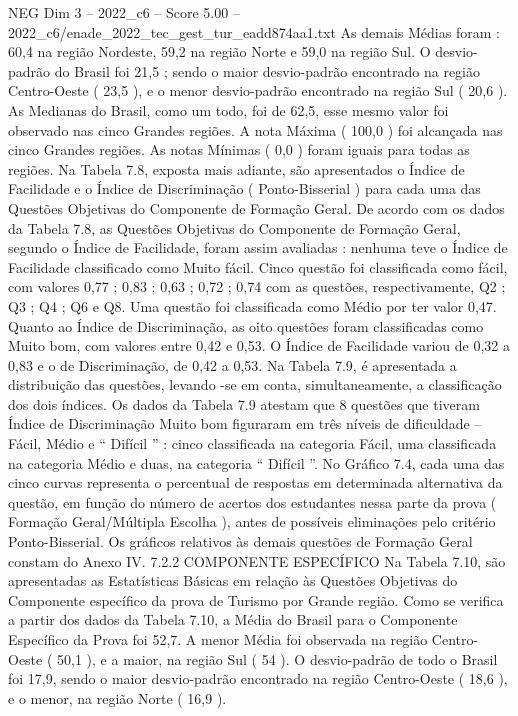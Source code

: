 \begin{textsample}{NEG Dim 3 – 2022\_c6 – Score 5.00 – 2022\_c6/enade\_2022\_tec\_gest\_tur\_eadd874aa1.txt}
As demais Médias foram : 60,4 na região Nordeste, 59,2 na região Norte e 59,0 na região Sul.
O desvio-padrão do Brasil foi 21,5 ; sendo o maior desvio-padrão encontrado na região Centro-Oeste ( 23,5 ), e o menor desvio-padrão encontrado na região Sul ( 20,6 ).
As Medianas do Brasil, como um todo, foi de 62,5, esse mesmo valor foi observado nas cinco Grandes regiões.
A nota Máxima ( 100,0 ) foi alcançada nas cinco Grandes regiões.
As notas Mínimas ( 0,0 ) foram iguais para todas as regiões.
Na Tabela 7.8, exposta mais adiante, são apresentados o Índice de Facilidade e o Índice de Discriminação ( Ponto-Bisserial ) para cada uma das Questões Objetivas do Componente de Formação Geral.
De acordo com os dados da Tabela 7.8, as Questões Objetivas do Componente de Formação Geral, segundo o Índice de Facilidade, foram assim avaliadas : nenhuma teve o Índice de Facilidade classificado como Muito fácil.
Cinco questão foi classificada como fácil, com valores 0,77 ; 0,83 ; 0,63 ; 0,72 ; 0,74 com as questões, respectivamente, Q2 ; Q3 ; Q4 ; Q6 e Q8.
Uma questão foi classificada como Médio por ter valor 0,47.
Quanto ao Índice de Discriminação, as oito questões foram classificadas como Muito bom, com valores entre 0,42 e 0,53.
O Índice de Facilidade variou de 0,32 a 0,83 e o de Discriminação, de 0,42 a 0,53.
Na Tabela 7.9, é apresentada a distribuição das questões, levando -se em conta, simultaneamente, a classificação dos dois índices.
Os dados da Tabela 7.9 atestam que 8 questões que tiveram Índice de Discriminação Muito bom figuraram em três níveis de dificuldade – Fácil, Médio e “ Difícil ” : cinco classificada na categoria Fácil, uma classificada na categoria Médio e duas, na categoria “ Difícil ”.
No Gráfico 7.4, cada uma das cinco curvas representa o percentual de respostas em determinada alternativa da questão, em função do número de acertos dos estudantes nessa parte da prova ( Formação Geral/Múltipla Escolha ), antes de possíveis eliminações pelo critério Ponto-Bisserial.
Os gráficos relativos às demais questões de Formação Geral constam do Anexo IV. 7.2.2 COMPONENTE ESPECÍFICO Na Tabela 7.10, são apresentadas as Estatísticas Básicas em relação às Questões Objetivas do Componente específico da prova de Turismo por Grande região.
Como se verifica a partir dos dados da Tabela 7.10, a Média do Brasil para o Componente Específico da Prova foi 52,7.
A menor Média foi observada na região Centro-Oeste ( 50,1 ), e a maior, na região Sul ( 54 ).
O desvio-padrão de todo o Brasil foi 17,9, sendo o maior desvio-padrão encontrado na região Centro-Oeste ( 18,6 ), e o menor, na região Norte ( 16,9 ).

\end{textsample}
